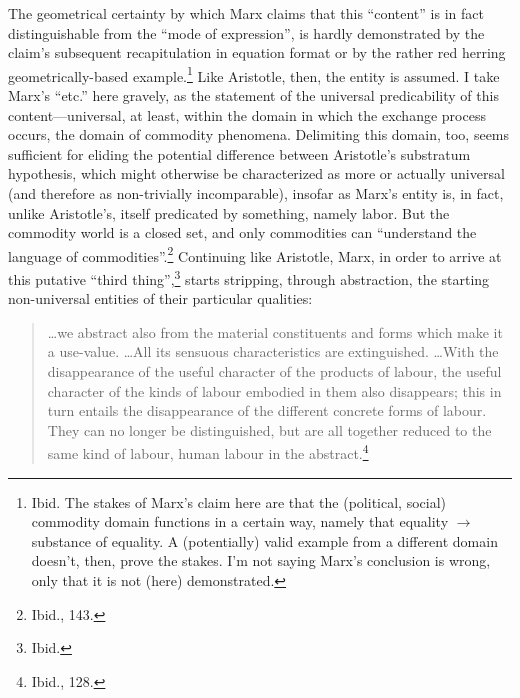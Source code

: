 \documentclass[12pt]{article}
\begin{document}
The geometrical certainty by which Marx claims that this ``content'' is in fact distinguishable from the ``mode of expression'', is hardly demonstrated by the claim's subsequent recapitulation in equation format or by the rather red herring geometrically-based example.\footnote{Ibid. The stakes of Marx's claim here are that the (political, social) commodity domain functions in a certain way, namely that equality $\rightarrow$ substance of equality. A (potentially) valid example from a different domain doesn't, then, prove the stakes. I'm not saying Marx's conclusion is wrong, only that it is not (here) demonstrated.} Like Aristotle, then, the entity is assumed. I take Marx's ``etc.'' here gravely, as the statement of the universal predicability of this content---universal, at least, within the domain in which the exchange process occurs, the domain of commodity phenomena. Delimiting this domain, too, seems sufficient for eliding the potential difference between Aristotle's substratum hypothesis, which might otherwise be characterized as more or actually universal (and therefore as non-trivially incomparable), insofar as Marx's entity is, in fact, unlike Aristotle's, itself predicated by something, namely labor. But the commodity world is a closed set, and only commodities can ``understand the language of commodities''.\footnote{Ibid., 143.} Continuing like Aristotle, Marx, in order to arrive at this putative ``third thing'',\footnote{Ibid.} starts stripping, through abstraction, the starting non-universal entities of their particular qualities:  

\begin{quote}
\begin{singlespace}
\dots  we abstract also from the material constituents and forms which make it a use-value. \dots  All its sensuous characteristics are extinguished. \dots  With the disappearance of the useful character of the products of labour, the useful character of the kinds of labour embodied in them also disappears; this in turn entails the disappearance of the different concrete forms of labour. They can no longer be distinguished, but are all together reduced to the same kind of labour, human labour in the abstract.\footnote{Ibid., 128.}
\end{singlespace}
\end{quote}
\end{document}
